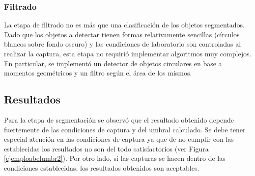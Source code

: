 \subsubsection{Filtrado}
La etapa de filtrado no es más que una clasificación de los objetos segmentados. Dado que los objetos a detectar tienen formas relativamente sencillas (círculos blancos sobre fondo oscuro) y las condiciones de laboratorio son controladas al realizar la captura, esta etapa no requirió implementar algoritmos muy complejos. En particular, se implementó un detector de objetos circulares en base a momentos geométricos\cite{imageMoments} y un filtro según el área de los mismos.

\subsection{Resultados}
Para la etapa de segmentación se observó que el resultado obtenido depende fuertemente de las condiciones de captura y del umbral calculado. Se debe tener especial atención en las condiciones de captura ya que de no cumplir con las establecidas los resultados no son del todo satisfactorios (ver Figura \ref{ejemploabelumbr2}). Por otro lado, si las capturas se hacen dentro de las condiciones establecidas, los resultados obtenidos son aceptables.

